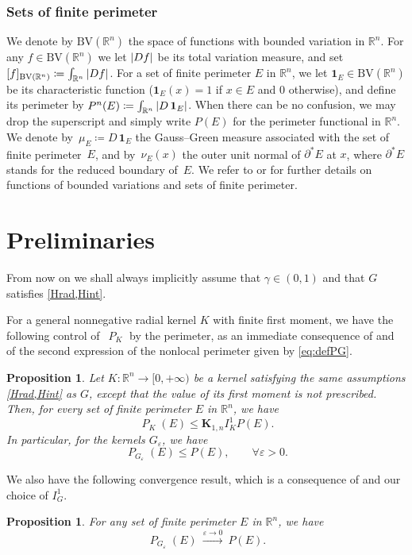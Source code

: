\documentclass[JEP,XML,SOM,Unicode,published]{cedram}
\numberwithin{equation}{section}
\theoremstyle{plain}
\newtheorem{prp}[thm]{Proposition}
\theoremstyle{definition}
\newcommand{\numberset}[1]{{\mathbb{#1}}}
\newcommand{\R}{\numberset{R}}
\newcommand{\bfK}{\boldsymbol{K}}
\let\eps\varepsilon
\newcommand{\ind}{{\mathbf{1}}}
\newcommand{\Ren}{{\R^n}}
\newcommand{\bv}{\mathrm{BV}}
\DeclareMathOperator{\Per}{\mathit{P}}
\DeclarePairedDelimiter{\abs}{\lvert}{\rvert}
\DeclarePairedDelimiter{\seminorm}{\lbrack}{\rbrack}
\begin{document}
\subsubsection*{Sets of finite perimeter}
We denote by $\bv(\Ren)$ the space of functions with bounded variation in $\Ren$. For any $f\in
\bv(\Ren)$ we let $\abs{Df}$ be its total variation measure, and set
$\seminorm{f}_{\bv(\Ren)}\coloneqq\int_{\Ren}\, \abs{Df}$.
For a set of finite perimeter $E$ in $\Ren$, we let $\ind_E\in\bv(\Ren)$ be its characteristic
function (\ie $\ind_E(x)=1$ if $x\in E$ and $0$ otherwise), and define its perimeter by
$P^n(E)\coloneqq \int_{\Ren}\,\abs{D\,\ind_E}$. When there can be no confusion, we may drop the
superscript and simply write $P(E)$ for the perimeter functional in $\Ren$.
We denote by~$\mu_E\coloneqq D\,\ind_E$ the Gauss--Green measure associated with the set of finite
perimeter~$E$, and by~$\nu_E(x)$ the outer unit normal of $\partial^* E$ at $x$, where $\partial^*E$
stands for the reduced boundary of~$E$.
We refer to \eg \cite[Chap.\,5]{EG2015} or \cite{Mag2012} for further details on functions
of bounded variations and sets of finite perimeter.

\section{Preliminaries}\label{sec:prelim}

From now on we shall always implicitly assume that $\gamma\in(0,1)$ and that $G$ satisfies
\cref{Hrad,Hint}.

For a general nonnegative radial kernel $K$ with finite first moment, we have the following control
of~$\Per_K$ by the perimeter, as an immediate consequence of \cite[Prop.\,3.1]{Peg2021} and
of the second expression of the nonlocal perimeter given by \cref{eq:defPG}.

\begin{prp}\label{prp:boundPerG}
Let $K:\Ren\to [0,+\infty)$ be a kernel satisfying the same assumptions \cref{Hrad,Hint} as $G$,
except that the value of its first moment is not prescribed.
Then, for every set of finite perimeter $E$ in $\R^n$, we have
\[
\Per_{K}(E)\leq \bfK_{1,n}I_K^1 P(E).
\]
In particular, for the kernels $G_\eps$, we have
\[
\Per_{G_\eps}(E)\leq P(E),\qquad\forall \eps>0.
\]
\end{prp}

We also have the following convergence result, which is a consequence of \cite{Dav2002} and our
choice of $I_G^1$.

\begin{prp}\label{prp:limPerG}
For any set of finite perimeter $E$ in $\Ren$, we have
\begin{equation}\label{limPerG:res}
\Per_{G_\eps}(E)~\xrightarrow{\eps\to 0}~ P(E).
\end{equation}
\end{prp}
\end{document}
